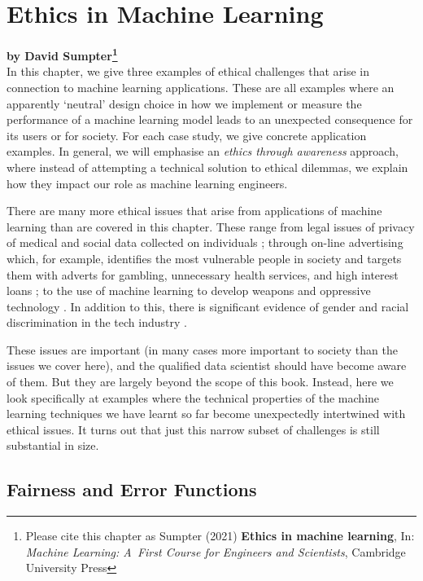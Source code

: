 
\chapter{Ethics in Machine Learning}\label{ch:ethics}

\textbf{by David Sumpter\footnote{Please cite this chapter as Sumpter (2021) \textbf{Ethics in machine learning}, In: \textit{Machine Learning: A~First Course for Engineers and Scientists}, Cambridge University Press}} \\%

\noindent In this chapter, we give three examples of ethical challenges that arise in connection to machine learning applications. These are all examples where an apparently `neutral' design choice in how we implement or measure the performance of a machine learning model leads to an unexpected consequence for its users or for society. For each case study, we give concrete application examples. In general, we will emphasise an \textit{ethics through awareness} approach, where instead of attempting a technical solution to ethical dilemmas, we explain how they impact our role as machine learning engineers.

There are many more ethical issues that arise from applications of machine learning than are covered in this chapter. These range from legal issues of privacy of medical and social data collected on individuals \parencite{pasquale2015black}; through on-line advertising which, for example, identifies the most vulnerable people in society and targets them with adverts for gambling, unnecessary health services, and high interest loans \parencite{o2016weapons};  to the use of machine learning to develop weapons and oppressive technology \parencite{russell2015ethics}. In addition to this, there is significant evidence of gender and racial discrimination in the tech industry \parencite{alfrey2017gender}.

These issues are important (in many cases more important to society than the issues we cover here), and the qualified data scientist should have become aware of them. But they are largely beyond the scope of this book. Instead, here we look specifically at examples where the technical properties of the machine learning techniques we have learnt so far become unexpectedly intertwined with ethical issues. It turns out that just this narrow subset of challenges is still substantial in size.

\section{Fairness and Error Functions}\label{ch12:sec12.1}

